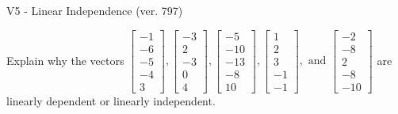 \begin{exercise}
  \begin{exerciseTitle}V5 - Linear Independence (ver. 797)\end{exerciseTitle}
  \begin{exerciseStatement}
    Explain why the vectors \(\left[\begin{array}{r}
-1 \\
-6 \\
-5 \\
-4 \\
3
\end{array}\right] , \left[\begin{array}{r}
-3 \\
2 \\
-3 \\
0 \\
4
\end{array}\right] , \left[\begin{array}{r}
-5 \\
-10 \\
-13 \\
-8 \\
10
\end{array}\right] , \left[\begin{array}{r}
1 \\
2 \\
3 \\
-1 \\
-1
\end{array}\right] , \text{ and } \left[\begin{array}{r}
-2 \\
-8 \\
2 \\
-8 \\
-10
\end{array}\right]\) are linearly dependent or linearly independent.	



\end{exerciseStatement}
\end{exercise}
